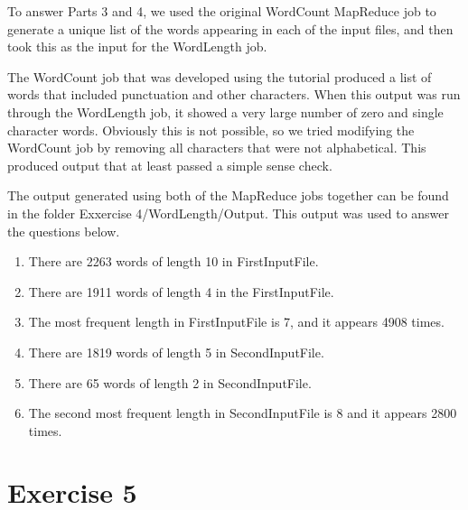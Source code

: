 \documentclass[12t]{article}
\begin{document}
	To answer Parts 3 and 4, we used the original WordCount MapReduce job to generate a unique list of the words appearing in each of the input files, and then took this as the input for the WordLength job. 
	
	The WordCount job that was developed using the tutorial produced a list of words that included punctuation and other characters. When this output was run through the WordLength job, it showed a very large number of zero and single character words. Obviously this is not possible, so we tried modifying the WordCount job by removing all characters that were not alphabetical. This produced output that at least passed a simple sense check. 
	
	The output generated using both of the MapReduce jobs together can be found in the folder Exxercise 4/WordLength/Output. This output was used to answer the questions below. 
	
\begin{enumerate} 
  \item There are 2263 words of length 10 in FirstInputFile.
  \item There are 1911 words of length 4 in the FirstInputFile.
  \item The most frequent length in  FirstInputFile is 7, and it appears 4908 times.
  \item There are 1819 words of length 5 in SecondInputFile.
  \item There are 65 words of length 2 in SecondInputFile.
  \item The second most frequent length in SecondInputFile is 8 and it appears 2800 times. 
\end{enumerate}
	
	\section*{Exercise 5}


\end{document}
